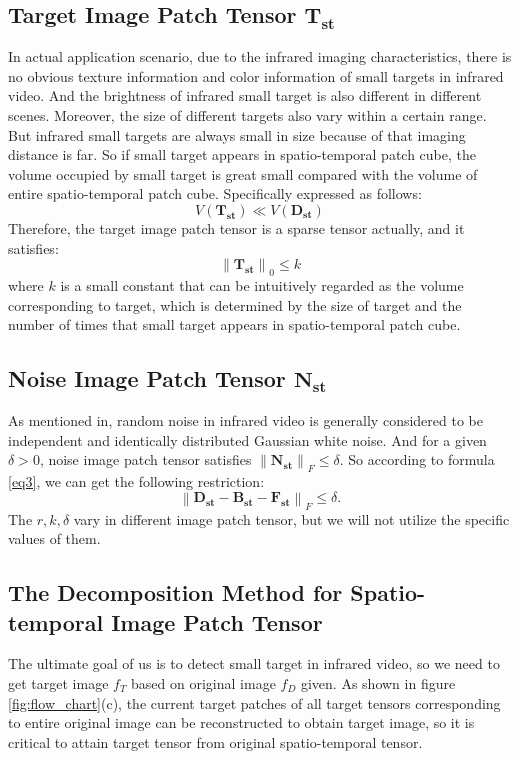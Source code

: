 \documentclass[journal]{IEEEtran}
\begin{document}
\subsection{Target Image Patch Tensor $\mathbf{T_{st}}$}
In actual application scenario, due to the infrared imaging characteristics, there is no obvious texture information and color information of small targets in infrared video. And the brightness of infrared small target is also different in different scenes. Moreover, the size of different targets also vary within a certain range. But infrared small targets are always small in size because of that imaging distance is far. So if small target appears in spatio-temporal patch cube, the volume occupied by small target is great small compared with the volume of entire spatio-temporal patch cube. Specifically expressed as follows:
\begin{equation}
  V(\bm{T_{st}}) \ll V(\bm{D_{st}})
\end{equation}
Therefore, the target image patch tensor is a sparse tensor actually, and it satisfies:
\begin{equation}
  \left \| \bm{T_{st}} \right \|_0 \leq k
\end{equation}
where $k$ is a small constant that can be intuitively regarded as the volume corresponding to target, which is determined by the size of target and the number of times that small target appears in spatio-temporal patch cube.

\subsection{Noise Image Patch Tensor $\mathbf{N_{st}}$}
As mentioned in\cite{gao2013infrared}, random noise in infrared video is generally considered to be independent and identically distributed Gaussian white noise. And for a given $\delta>0$, noise image patch tensor satisfies $\left \| \bm{N_{st}} \right \|_F \leq \delta$. So according to formula \ref{eq3}, we can get the following restriction:
\begin{equation}
  \left \| \bm{D_{st}}-\bm{B_{st}}-\bm{F_{st}} \right \|_F \leq \delta.
\end{equation}
The $r,k,\delta$ vary in different image patch tensor, but we will not utilize the specific values of them.


\subsection{The Decomposition Method for Spatio-temporal Image Patch Tensor}
The ultimate goal of us is to detect small target in infrared video, so we need to get target image $f_T$ based on original image $f_D$ given. As shown in figure \ref{fig:flow_chart}(c), the current target patches of all target tensors corresponding to entire original image can be reconstructed to obtain target image, so it is critical to attain target tensor from original spatio-temporal tensor.
\end{document}
